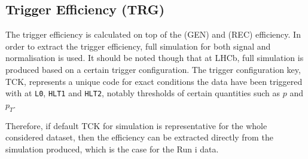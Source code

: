 %
%		


\subsection{Trigger Efficiency (TRG)}
\label{trigef}
 The trigger efficiency is calculated on top of the (GEN) and (REC) efficiency. In order to extract the trigger efficiency, full simulation for both signal and normalisation is used. It should be noted though that at \gls{LHCb}, full simulation is produced based on a certain trigger configuration. The trigger configuration key, TCK, represents a unique code for exact conditions the data have been triggered with at \texttt{L0}, \texttt{HLT1} and \texttt{HLT2}, notably thresholds of certain quantities such as $p$ and $p_{T}$. 
 
Therefore, if default TCK for simulation is representative for the whole considered dataset, then the efficiency can be extracted directly from the simulation produced, which is the case for the Run \Rn{1} data.

